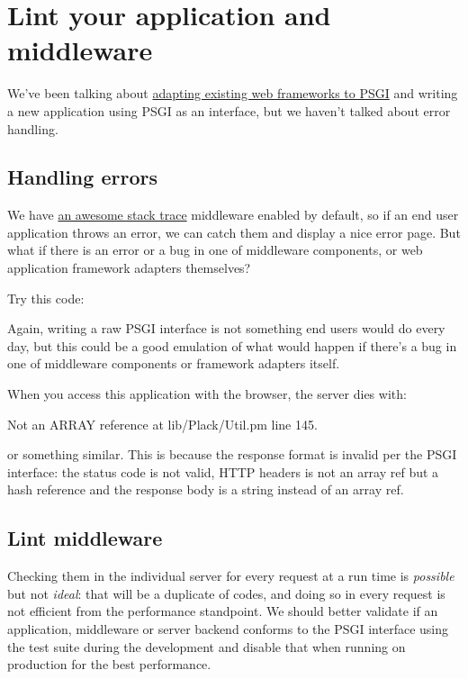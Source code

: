 \chapter{Lint your application and middleware}
\label{day-21-lint-your-application-and-middleware}

We've been talking about
\href{http://advent.plackperl.org/2009/12/day-8-adapting-web-frameworks-to-psgi.html}{adapting
existing web frameworks to PSGI} and writing a new application using
PSGI as an interface, but we haven't talked about error handling.

\section{Handling errors}\label{handling-errors}

We have
\href{http://advent.plackperl.org/2009/12/day-3-using-plackup.html}{an
awesome stack trace} middleware enabled by default, so if an end user
application throws an error, we can catch them and display a nice error
page. But what if there is an error or a bug in one of middleware
components, or web application framework adapters themselves?

Try this code:


Again, writing a raw PSGI interface is not something end users would do
every day, but this could be a good emulation of what would happen if
there's a bug in one of middleware components or framework adapters
itself.

When you access this application with the browser, the server dies with:

\begin{shell}
Not an ARRAY reference at lib/Plack/Util.pm line 145.
\end{shell}
%
or something similar. This is because the response format is invalid per
the PSGI interface: the status code is not valid, HTTP headers is not an
array ref but a hash reference and the response body is a string instead
of an array ref.

\section{Lint middleware}\label{lint-middleware}

Checking them in the individual server for every request at a run time
is \emph{possible} but not \emph{ideal}: that will be a duplicate of
codes, and doing so in every request is not efficient from the
performance standpoint. We should better validate if an application,
middleware or server backend conforms to the PSGI interface using the
test suite during the development and disable that when running on
production for the best performance.

